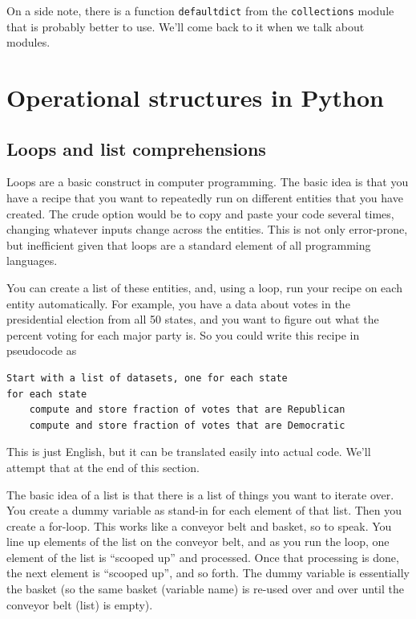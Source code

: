 \documentclass[
  letterpaper,
]{scrbook}
\begin{document}
On a side note, there is a function \texttt{defaultdict} from the \texttt{collections} module that is probably better to use. We'll come back to it when we talk about modules.

\hypertarget{operational-structures-in-python}{%
\section{Operational structures in Python}\label{operational-structures-in-python}}

\hypertarget{loops-and-list-comprehensions}{%
\subsection{Loops and list comprehensions}\label{loops-and-list-comprehensions}}

Loops are a basic construct in computer programming. The basic idea is that you have a recipe that you want to repeatedly run on different entities that you have created. The crude option would be to copy and paste your code several times, changing whatever inputs change across the entities. This is not only error-prone, but inefficient given that loops are a standard element of all programming languages.

You can create a list of these entities, and, using a loop, run your recipe on each entity automatically. For example, you have a data about votes in the presidential election from all 50 states, and you want to figure out what the percent voting for each major party is. So you could write this recipe in pseudocode as

\begin{verbatim}
Start with a list of datasets, one for each state
for each state
    compute and store fraction of votes that are Republican
    compute and store fraction of votes that are Democratic
\end{verbatim}

This is just English, but it can be translated easily into actual code. We'll attempt that at the end of this section.

The basic idea of a list is that there is a list of things you want to iterate over. You create a dummy variable as stand-in for each element of that list. Then you create a for-loop. This works like a conveyor belt and basket, so to speak. You line up elements of the list on the conveyor belt, and as you run the loop, one element of the list is ``scooped up'' and processed. Once that processing is done, the next element is ``scooped up'', and so forth. The dummy variable is essentially the basket (so the same basket (variable name) is re-used over and over until the conveyor belt (list) is empty).
\end{document}
